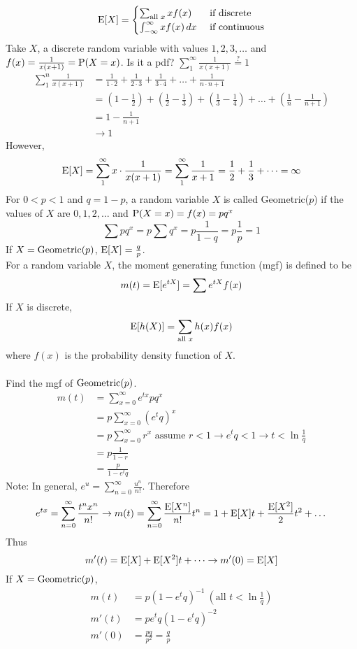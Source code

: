 \documentclass[12pt]{article}
\begin{document}
$$\mathrm{E}[ X ] = \begin{cases} \sum_{\text{all } x} xf(x) &\text{ if discrete} \\ \int_{-\infty}^\infty xf(x)\, dx &\text{ if continuous} \end{cases} $$ 
Take $X$, a discrete random variable with values $1,2,3,\dots$ and $f(x) = \frac{1}{x(x+1)} = \mathrm{P}( X = x )$. Is it a pdf? $ \sum_1^\infty \frac{1}{x(x+1)} \stackrel{?}{=} 1$
$$ \begin{aligned} \sum_1^n \frac{1}{x(x+1)} &= \frac{1}{1 \cdot 2} + \frac{1}{2 \cdot 3} + \frac{1}{3 \cdot 4} + \dots + \frac{1}{n \cdot n+1} \\ &= (1 - \frac{1}{2}) + (\frac{1}{2} - \frac{1}{3}) + (\frac{1}{3} - \frac{1}{4}) + \dots + (\frac{1}{n} - \frac{1}{n+1}) \\ &= 1 - \frac{1}{n+1} \\ &\to 1 \end{aligned} $$ 
However, $$ \mathrm{E}[ X ] = \sum_1^\infty x \cdot \frac{1}{x(x+1)} = \sum_1^\infty \frac{1}{x+1} = \frac{1}{2} + \frac{1}{3} + \dots = \infty $$ 
For $0 < p < 1$ and $q = 1-p$, a random variable $X$ is called Geometric($p$) if the values of $X$ are $0, 1, 2, \dots$ and $\mathrm{P}( X = x ) = f(x) = pq^x$
$$ \sum pq^x = p \sum q^x = p \frac{1}{1 - q} = p \frac{1}{p} = 1 $$ 
If $X = \text{Geometric}( p )$, $\mathrm{E}[ X ] = \frac{q}{p}$. \\
For a random variable $X$, the moment generating function (mgf) is defined to be $$m(t) = \mathrm{E}[ e^{tX} ] = \sum e^{tX}f(x) $$ 
If $X$ is discrete, $$\mathrm{E}[ h(X) ] = \sum_{\text{all } x} h(x)f(x) $$ where $f(x)$ is the probability density function of $X$. \\~\\
Find the mgf of $\text{Geometric}( p )$. 
$$ \begin{aligned} m(t) &= \sum_{x=0}^\infty e^{tx} pq^x \\ &= p \sum_{x = 0}^\infty (e^tq)^x \\ &= p\sum_{x=0}^\infty r^x \text{ assume } r < 1 \to e^t q < 1 \to t < \ln \frac{1}{q} \\ &= p\frac{1}{1-r} \\ &= \frac{p}{1 - e^tq} \end{aligned} $$ 
Note: In general, $e^u = \sum_{n=0}^\infty \frac{u^n}{n!}$. Therefore 
$$ e^{tx} = \sum_{n=0}^\infty \frac{t^nx^n}{n!} \to m(t) = \sum_{n=0}^\infty \frac{\mathrm{E}[ X^n ]}{n!}t^n = 1 + \mathrm{E}[ X ]t + \frac{\mathrm{E}[ X^2 ]}{2}t^2 + \dots $$ 
Thus $$m'(t) = \mathrm{E}[ X ] + \mathrm{E}[ X^2 ]t + \dots \to m'(0) = \mathrm{E}[ X ]$$ 
If $X = \text{Geometric}( p )$, $$ \begin{aligned} m(t) &= p(1 - e^tq)^{-1} ~ (\text{all } t < \ln \frac{1}{q}) \\
m'(t) &= pe^tq(1 - e^tq)^{-2} \\ m'(0) &= \frac{pq}{p^2} = \frac{q}{p} \end{aligned} $$ 
\end{document}
